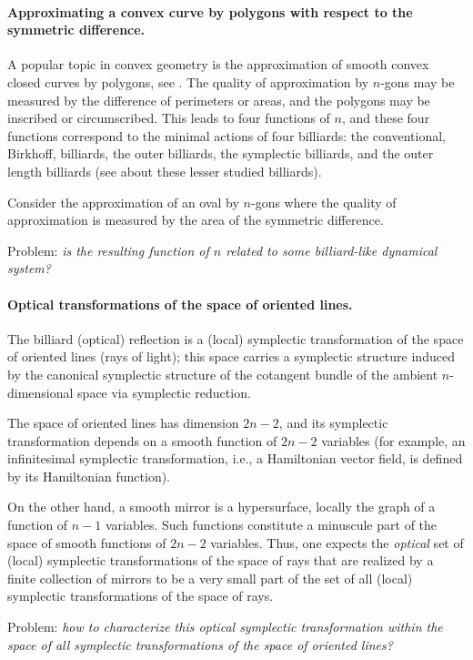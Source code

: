 \documentclass[11pt]{article}
\theoremstyle{definition}
\begin{document}
\paragraph{Approximating a convex curve by polygons with respect to the symmetric difference.} A popular topic in convex geometry is the approximation of smooth convex closed curves by polygons, see \cite{Gr}. The quality of approximation by $n$-gons may be measured by the difference of perimeters or areas, and the polygons may be inscribed or circumscribed. This leads to four functions of $n$, and these four functions correspond to the minimal actions of four billiards: the conventional, Birkhoff, billiards, the outer billiards, the symplectic billiards, and the outer length billiards (see \cite{AT24,BBF} about these lesser studied billiards). 

Consider the approximation of an oval by $n$-gons where the quality of approximation is measured by the area of the symmetric difference. 

Problem: {\it is the resulting function of $n$ related to some billiard-like dynamical system?}

\paragraph{Optical transformations of the space of oriented lines.} The billiard (optical) reflection is a (local) symplectic transformation of the space of oriented lines (rays of light); this space carries a symplectic structure induced by the canonical symplectic structure of the cotangent bundle of the ambient  $n$-dimensional space via symplectic reduction.

The space of oriented lines has dimension $2n-2$, and its symplectic transformation depends on a smooth function of $2n-2$ variables (for example, an infinitesimal symplectic transformation, i.e., a Hamiltonian vector field, is defined by its Hamiltonian function).

On the other hand, a smooth mirror is a hypersurface, locally the graph of a function of $n-1$ variables. Such functions constitute a minuscule part of the space of smooth functions of $2n-2$ variables. Thus, one expects the {\it optical} set of (local) symplectic transformations of the space of rays that are realized by a finite collection of mirrors to be a very small part of the set of all (local) symplectic transformations of the space of rays.

Problem: {\it how to characterize this optical symplectic transformation within the space of all symplectic transformations of the space of oriented lines?}
\end{document}
